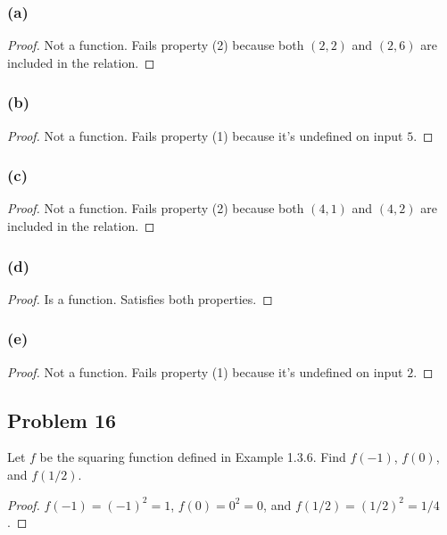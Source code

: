 \documentclass[14pt]{extarticle}
\begin{document}
\subsubsection{(a)}

\begin{proof}
Not a function. Fails property (2) because both $(2, 2)$ and $(2, 6)$ are
included in the relation.
\end{proof}

\subsubsection{(b)}

\begin{proof}
Not a function. Fails property (1) because it's undefined on input $5$.
\end{proof}

\subsubsection{(c)}

\begin{proof}
Not a function. Fails property (2) because both $(4, 1)$ and $(4, 2)$ are
included in the relation.
\end{proof}

\subsubsection{(d)}

\begin{proof}
Is a function. Satisfies both properties.
\end{proof}

\subsubsection{(e)}

\begin{proof}
Not a function. Fails property (1) because it's undefined on input $2$.
\end{proof}

\subsection{Problem 16}
Let $f$ be the squaring function defined in Example 1.3.6.
Find $f(-1)$, $f(0)$, and $f(1/2)$.

\begin{proof}
$f(-1) = (-1)^2 = 1$, $f(0) = 0^2 = 0$, and $f(1/2) = (1/2)^2 = 1/4$.
\end{proof}
\end{document}
